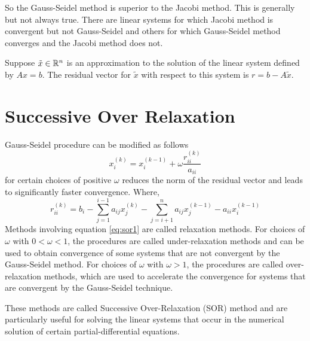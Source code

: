 \documentclass[../main-sheet.tex]{subfiles}
\begin{document}
    So the Gauss-Seidel method is superior to the Jacobi method. This is generally but not always true. There are linear systems for which Jacobi method is convergent but not Gauss-Seidel and others for which Gauss-Seidel method converges and the Jacobi method does not.

    \begin{defn}
        Suppose \(\tilde{x}\in \mathbb{R}^n\) is an approximation to the solution of the linear system defined by \(Ax=b\). The residual vector for \(\tilde{x}\) with respect to this system is \(r=b-A\tilde{x}\).
    \end{defn}
    \section{Successive Over Relaxation}
    Gauss-Seidel procedure can be modified as follows
    \begin{equation}
        x_i^{(k)}=x_i^{(k-1)}+\omega \frac{r_{ii}^{(k)}}{a_{ii}}\label{eq:sor1}
    \end{equation}
    for certain choices of positive \(\omega\) reduces the norm of the residual vector and leads to significantly faster convergence. Where,
    \[
        r_{ii}^{(k)}=b_i-\sum_{j=1}^{i-1}a_{ij}x_j^{(k)}-\sum_{j=i+1}^{n}a_{ij}x_j^{(k-1)}-a_{ii}x_i^{(k-1)}
    \]
    Methods involving equation \eqref{eq:sor1} are called relaxation methods. For choices of \(\omega\) with \(0<\omega<1\), the procedures are called under-relaxation methods and can be used to obtain convergence of some systems that are not convergent by the Gauss-Seidel method. For choices of \(\omega\) with \(\omega>1\), the procedures are called over-relaxation methods, which are used to accelerate the convergence for systems that are convergent by the Gauss-Seidel technique.

    These methods are called Successive Over-Relaxation (SOR) method and are particularly useful for solving the linear systems that occur in the numerical solution of certain partial-differential equations.
    
\end{document}
